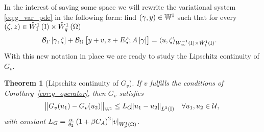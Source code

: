 \documentclass[final]{siamltex}
\newtheorem{thm}[theorem]{Theorem}
\begin{document}
In the interest of saving some space we will rewrite the variational system \eqref{eq:g_var_pde} in the following  form: find $\del{\gamma, y} \in {\mathbb{W}}^1$ such that for every $\del{\zeta, z} \in {{\mathring{W}^{1}_{1}\del{{\text{\rm I}}}}} \times {{\mathring{W}^{1}_{q}\del{\Omega}}}$
	\begin{align} \label{eq:g_var_pde_one}
		{{\mathcal{B}}_\Gamma}\sbr{\gamma, \zeta} + {{\mathcal{B}}_\Omega}\sbr{y+v, z + E\zeta; A\sbr{\gamma}} &= {{\mathop{{\left\langle {{u,\zeta}} \right\rangle}}}_{{{W^{{-{1}}}_{{{\infty}}}\del{{{\text{\rm I}}}}}}\times{{\mathring{W}^{{{1}}}_{{{1}}}\del{{{\text{\rm I}}}}}}}}.
	\end{align} 
With this new notation in place we are ready to study the Lipschitz continuity of $G_v$.
\begin{thm}[Lipschitz continuity of $G_v$]  \label{thm:g_lipschitz} 
If $v$ fulfills  the conditions of Corollary~\ref{cor:g_operator}, then $G_v$ satisfies 
	\begin{align} \label{eq:g_lipschitz}
   		\norm{G_v(u_1) - G_v(u_2)}_{{\mathbb{W}}^1} \leq L_G{\norm{{u_1-u_2}}_{{L^2\del{{{\text{\rm I}}}}}}} &&\forall u_1, u_2 \in {\mathcal{U}},
	\end{align}
with constant $L_G = \frac{\alpha}{\theta_2}\del{1+\beta C_A}^2{\abs{{v}}_{{W^{{1}}_{{p}}\del{{\Omega}}}}}$.   
\end{thm}
\end{document}
